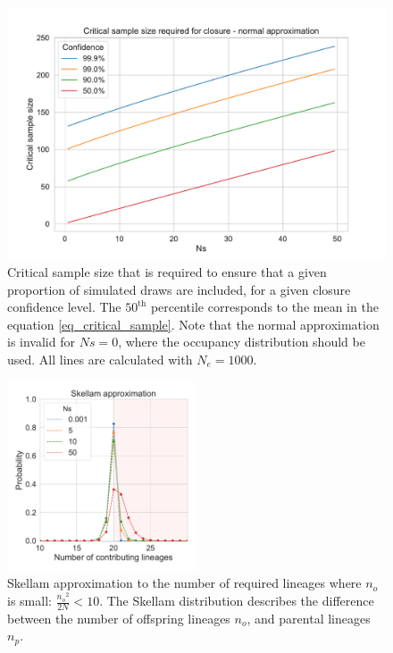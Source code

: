 \documentclass[review,nonatbib]{elsarticle}
\begin{document}
\begin{figure}[H]
  \centering
  \includegraphics[width=\textwidth]{fig/critical_normal.pdf}
  \caption{Critical sample size that is required to ensure that a given proportion of simulated
  draws are included, for a given closure confidence level. The
    $50^\text{th}$ percentile corresponds to the mean in the equation \eqref{eq_critical_sample}. Note that the
    normal approximation is invalid for $Ns=0$, where the occupancy distribution should be used. All
    lines are calculated with $N_e=1000$.}
  \label{fig_apx_critical_normal}
\end{figure}

\begin{figure}[H]
  \centering
  \includegraphics[width=0.5\textwidth]{fig/skellam.pdf}
  \caption{Skellam approximation to the number of required lineages where $n_o$ is small:
  $\frac{{n_o}^2}{2N} < 10$. The Skellam distribution describes the difference between the number
  of offspring lineages $n_o$, and parental lineages $n_p$. }
  \label{fig_apx_skellam}
\end{figure}
\end{document}
